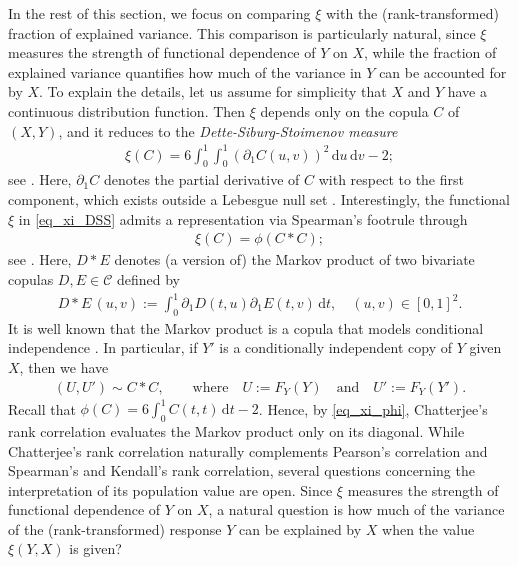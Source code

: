 \documentclass{article}
\newcommand{\CC}{\mathcal{C}}
\newcommand{\de}{\mathrm{\,d}}
\begin{document}
In the rest of this section, we focus on comparing \(\xi\) with the (rank-transformed) fraction of explained variance.
This comparison is particularly natural, since \(\xi\) measures the strength of functional dependence of \(Y\) on \(X\), while the fraction of explained variance quantifies how much of the variance in \(Y\) can be accounted for by \(X\).
To explain the details, let us assume for simplicity that \(X\) and \(Y\) have a continuous distribution function.
Then \(\xi\) depends only on the copula \(C \) of \((X,Y)\), and it reduces to the \emph{Dette-Siburg-Stoimenov measure}
\begin{align}\label{eq_xi_DSS}
    \xi(C) = 6 \int_0^1\int_0^1 (\partial_1 C(u,v))^2 \de u \de v - 2;
\end{align}
see \cite{dette2013copula}.
Here, \(\partial_1 C\) denotes the partial derivative of \(C\) with respect to the first component, which exists outside a Lebesgue null set \cite{nelsen2006introduction}.
Interestingly, the functional \(\xi\) in \eqref{eq_xi_DSS} admits a representation via Spearman's footrule through
\begin{align}\label{eq_xi_phi}
    \xi(C) = \phi(C\ast C);
\end{align}
see \cite{fuchs2024quantifying}.
Here, \(D\ast E\) denotes (a version of) the Markov product of two bivariate copulas \(D,E\in \CC\) defined by
\begin{align}\label{def_MK_product}
     D\ast E\,(u,v):=  \int_0^1 \partial_1 D(t,u) \partial_1 E(t,v) \de t, \quad (u,v)\in [0,1]^2.
\end{align}
It is well known that the Markov product is a copula that models conditional independence \cite[Chapter~5]{durante2016principles}.
In particular, if \(Y'\) is a conditionally independent copy of \(Y\) given \(X\), then we have
\begin{align}\label{eq_uus}
    (U,U')\sim C\ast C, \qquad \text{where}\quad U:= F_Y(Y) \quad \text{and} \quad U':=F_Y(Y').
\end{align}
Recall that \(\phi(C) = 6 \int_0^1 C(t,t) \de t - 2\).
Hence, by \eqref{eq_xi_phi}, Chatterjee's rank correlation evaluates the Markov product only on its diagonal.
While Chatterjee's rank correlation naturally complements Pearson's correlation and Spearman's and Kendall's rank correlation, several questions concerning the interpretation of its population value are open.
Since \(\xi\) measures the strength of functional dependence of \(Y\) on \(X\), a natural question is how much of the variance of the (rank-transformed) response \(Y\) can be explained by \(X\) when the value \(\xi(Y,X)\) is given?
\end{document}
